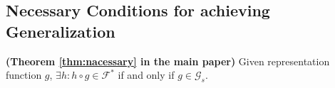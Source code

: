\subsection{Necessary Conditions for achieving Generalization}



\begin{theorem} \textbf{(Theorem \ref{thm:nacessary} in the main paper)} Given representation function $g$,
$\exists h: h\circ g\in \mathcal{F}^*$ if and only if $g\in \mathcal{G}_s$.
\label{thm:nacessary_apd}
\end{theorem}

